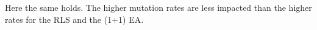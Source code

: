 Here the same holds.
The higher mutation rates are less impacted than the higher rates for the RLS and the (1+1) EA.